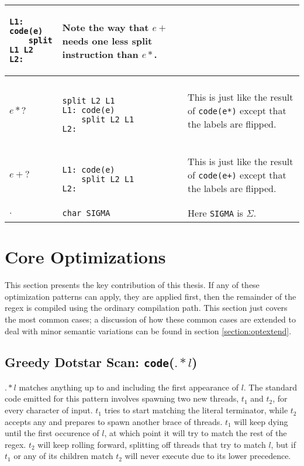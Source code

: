 \begin{table}[ht]
\begin{tabular}{| l | l | p{8cm} |}
\begin{minipage}{3cm}
\begin{verbatim}
L1: code(e)
    split L1 L2
L2: 
  \end{verbatim}
  \end{minipage}
  & Note the way that $e+$ needs one less split instruction than $e*$. \\ \hline
$e*?$ &
  \begin{minipage}{3cm}
  \begin{verbatim}

split L2 L1
L1: code(e)
    split L2 L1
L2: 
  \end{verbatim}
  \end{minipage}
  & This is just like the result of \verb'code(e*)' except that the
    labels are flipped. \\ \hline
$e+?$ &
  \begin{minipage}{3cm}
  \begin{verbatim}

L1: code(e)
    split L2 L1
L2: 
  \end{verbatim}
  \end{minipage}
  & This is just like the result of \verb'code(e+)' except that the
    labels are flipped. \\ \hline
$.$ & \verb'char SIGMA' & Here \verb'SIGMA' is $\Sigma$. \\ \hline
\end{tabular}
\end{table}

\section{Core Optimizations}
\label{section:skipscanopt}

This section presents the key contribution of this thesis. If any of
these optimization patterns can apply, they are applied first, then
the remainder of the regex is compiled using the ordinary compilation
path. This section just covers the most common cases; a discussion of
how these common cases are extended to deal with minor semantic
variations can be found in section \ref{section:optextend}.

\subsection{Greedy Dotstar Scan: {\tt code}($.*l$)}

$.*l$ matches anything up to and including the first appearance of $l$.
The standard code emitted for this pattern involves spawning two
new threads, $t_1$ and $t_2$, for every character of input.
$t_1$ tries to start matching the literal terminator, while $t_2$
accepts any and prepares to spawn another brace of threads.
$t_1$ will keep dying until the first occurence of $l$,
at which point it will try to match the rest of the regex.
$t_2$ will keep rolling forward, splitting off threads that try
to match $l$, but if $t_1$ or any of its children match
$t_2$ will never execute due to its lower precedence.


